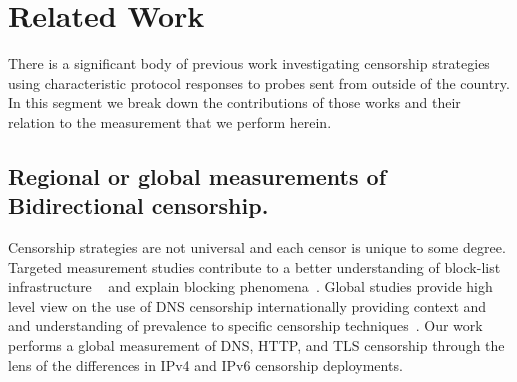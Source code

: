 \section{Related Work}\label{sec:related}

There is a significant body of previous work investigating censorship
strategies using characteristic protocol responses to probes sent from outside
of the country. In this segment we break down the contributions of those works
and their relation to the measurement that we perform herein.

\subsection{Regional or global measurements of Bidirectional censorship.}

Censorship strategies are not universal and each censor is unique to some
degree. Targeted measurement studies contribute to a better understanding of
block-list infrastructure ~\cite{ramesh2020decentralized, USESEC21:GFWatch} and
explain blocking phenomena~\cite{global2002great, Anonymous2020:TripletCensors}.
Global studies provide high level view on the use of DNS censorship
internationally providing context and and understanding of prevalence to
specific censorship techniques~\cite{vandersloot2018quack, scott2016satellite,
pearce2017global, sundara2020censored, niaki2020iclab}. Our work performs a
global measurement of DNS, HTTP, and TLS censorship through the lens of the
differences in IPv4 and IPv6 censorship deployments.





